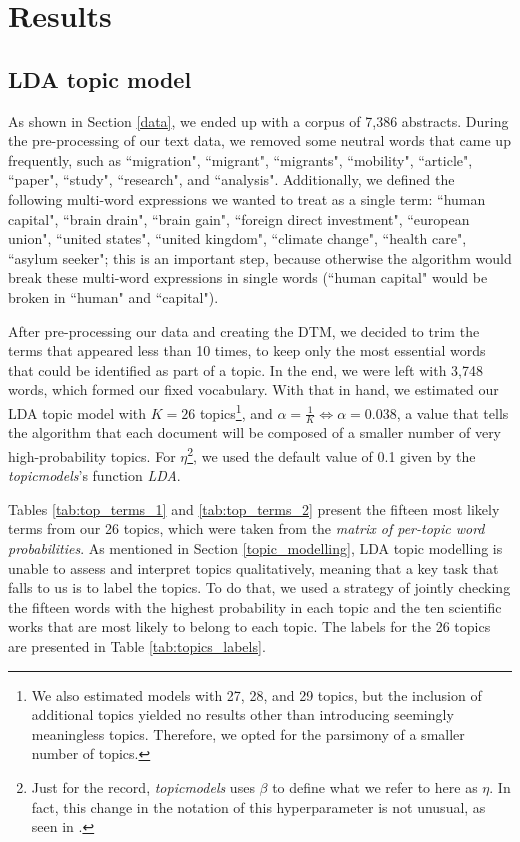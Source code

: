 \section{Results} \label{results}

\subsection{LDA topic model} \label{results_topic_model}

As shown in Section \ref{data}, we ended up with a corpus of 7,386 abstracts. During the pre-processing of our text data, we removed some neutral words that came up frequently, such as ``migration", ``migrant", ``migrants", ``mobility", ``article", ``paper", ``study", ``research", and ``analysis". Additionally, we defined the following multi-word expressions we wanted to treat as a single term: ``human capital", ``brain drain", ``brain gain", ``foreign direct investment", ``european union", ``united states", ``united kingdom", ``climate change", ``health care", ``asylum seeker"; this is an important step, because otherwise the algorithm would break these multi-word expressions in single words (``human capital" would be broken in ``human" and ``capital").

After pre-processing our data and creating the DTM, we decided to trim the terms that appeared less than 10 times, to keep only the most essential words that could be identified as part of a topic. In the end, we were left with 3,748 words, which formed our fixed vocabulary. With that in hand, we estimated our LDA topic model with $K = 26$ topics\footnote{We also estimated models with 27, 28, and 29 topics, but the inclusion of additional topics yielded no results other than introducing seemingly meaningless topics. Therefore, we opted for the parsimony of a smaller number of topics.}, and $\alpha = \frac{1}{K} \Leftrightarrow \alpha = 0.038$, a value that tells the algorithm that each document will be composed of a smaller number of very high-probability topics. For $\eta$\footnote{Just for the record, \textit{topicmodels} uses $\beta$ to define what we refer to here as $\eta$. In fact, this change in the notation of this hyperparameter is not unusual, as seen in \cite{ponweiser_latent_2012}.}, we used the default value of 0.1 given by the \textit{topicmodels}'s function \textit{LDA}. 

Tables \ref{tab:top_terms_1} and \ref{tab:top_terms_2} present the fifteen most likely terms from our 26 topics, which were taken from the \textit{matrix of per-topic word probabilities}. As mentioned in Section \ref{topic_modelling}, LDA topic modelling is unable to assess and interpret topics qualitatively, meaning that a key task that falls to us is to label the topics. To do that, we used a strategy of jointly checking the fifteen words with the highest probability in each topic and the ten scientific works that are most likely to belong to each topic. The labels for the 26 topics are presented in Table \ref{tab:topics_labels}. 

